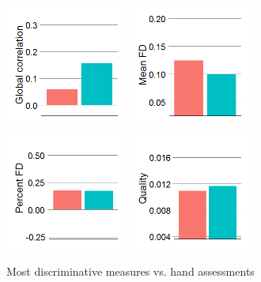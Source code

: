 \documentclass{frontiersSCNS} %
\begin{document}
\begin{figure}[h]
    \includegraphics[width=4cm]{fig4_ratings_func_Global_correlation}
    \includegraphics[width=4cm]{fig4_ratings_func_Mean_FD} \\
    \includegraphics[width=4cm]{fig4_ratings_func_Percent_FD}
    \includegraphics[width=4cm]{fig4_ratings_func_Quality}
  \caption{Most discriminative measures vs. hand assessments}
\end{figure}

\end{document}
